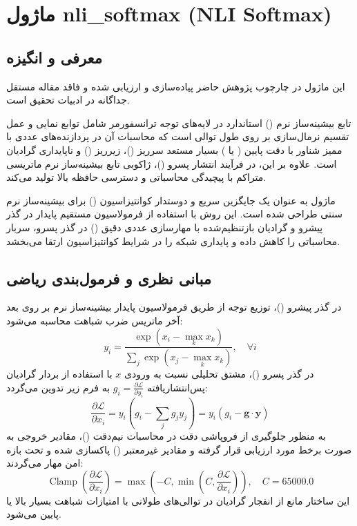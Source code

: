 \section{ماژول nli\_softmax (NLI Softmax)}
\label{sec:module_nli_softmax}

\subsection{معرفی و انگیزه}
این ماژول در چارچوب پژوهش حاضر پیاده‌سازی و ارزیابی شده و فاقد مقاله مستقل جداگانه در ادبیات تحقیق است.

تابع بیشینه‌ساز نرم () استاندارد در لایه‌های توجه ترانسفورمر شامل توابع نمایی و عمل تقسیم نرمال‌سازی بر روی طول توالی است که محاسبات آن در پردازنده‌های عددی با ممیز شناور با دقت پایین ( یا ) بسیار مستعد سرریز ()، زیرریز () و ناپایداری گرادیان است. علاوه بر این، در فرآیند انتشار پسرو ()، ژاکوبی تابع بیشینه‌ساز نرم ماتریسی متراکم با پیچیدگی محاسباتی و دسترسی حافظه بالا تولید می‌کند.

ماژول  به عنوان یک جایگزین سریع و دوستدار کوانتیزاسیون () برای بیشینه‌ساز نرم سنتی طراحی شده است. این روش با استفاده از فرمولاسیون مستقیم پایدار در گذر پیشرو و گرادیان بازتنظیم‌شده با مهارسازی عددی دقیق () در گذر پسرو، سربار محاسباتی را کاهش داده و پایداری شبکه را در شرایط کوانتیزاسیون ارتقا می‌بخشد.

\subsection{مبانی نظری و فرمول‌بندی ریاضی}
در گذر پیشرو ()، توزیع توجه از طریق فرمولاسیون پایدار بیشینه‌ساز نرم بر روی بعد آخر ماتریس ضرب شباهت محاسبه می‌شود:
\begin{equation}
y_i = \frac{\exp(x_i - \max_k x_k)}{\sum_j \exp(x_j - \max_k x_k)}, \quad \forall i
\end{equation}
در گذر پسرو ()، مشتق تحلیلی نسبت به ورودی $x$ با استفاده از بردار گرادیان پس‌انتشاریافته $g_i = \frac{\partial \mathcal{L}}{\partial y_i}$ به فرم زیر تدوین می‌گردد:
\begin{equation}
\frac{\partial \mathcal{L}}{\partial x_i} = y_i \left( g_i - \sum_j g_j y_j \right) = y_i (g_i - \mathbf{g} \cdot \mathbf{y})
\end{equation}
به منظور جلوگیری از فروپاشی دقت در محاسبات نیم‌دقت ()، مقادیر خروجی به صورت برخط مورد ارزیابی قرار گرفته و مقادیر غیرمعتبر () پاکسازی شده و تحت بازه امن مهار می‌گردند:
\begin{equation}
\operatorname{Clamp}\left(\frac{\partial \mathcal{L}}{\partial x_i}\right) = \max\left(-C, \min\left(C, \frac{\partial \mathcal{L}}{\partial x_i}\right)\right), \quad C = 65000.0
\end{equation}
این ساختار مانع از انفجار گرادیان در توالی‌های طولانی با امتیازات شباهت بسیار بالا یا پایین می‌شود.

